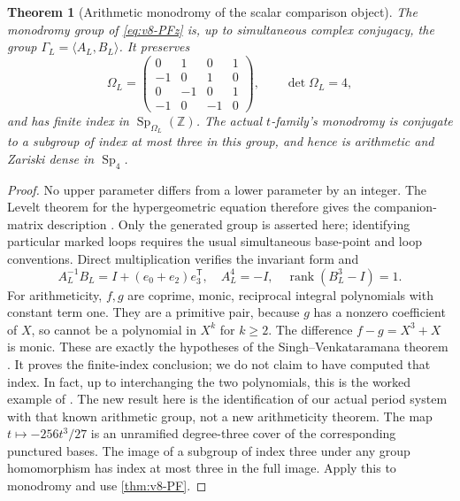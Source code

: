 \documentclass[11pt]{article}
\newtheorem{theorem}{Theorem}[section]
\theoremstyle{definition}
\theoremstyle{remark}
\newcommand{\Z}{\mathbb Z}
\newcommand{\rank}{\operatorname{rank}}
\begin{document}
\begin{theorem}[Arithmetic monodromy of the scalar comparison object]
\label{thm:v8-arithmetic-monodromy}
The monodromy group of \eqref{eq:v8-PFz} is, up to simultaneous complex
conjugacy, the group $\Gamma_L=\langle A_L,B_L\rangle$. It preserves
\begin{equation}
 \Omega_L=\begin{pmatrix}
 0&1&0&1\\-1&0&1&0\\0&-1&0&1\\-1&0&-1&0
 \end{pmatrix},\qquad \det\Omega_L=4,
 \label{eq:v8-Levelt-form}
\end{equation}
and has finite index in $\operatorname{Sp}_{\Omega_L}(\Z)$.
The actual $t$-family's monodromy is conjugate to a subgroup of index at
most three in this group, and hence is arithmetic and Zariski dense in
$\operatorname{Sp}_4$.
\end{theorem}
\begin{proof}
No upper parameter differs from a lower parameter by an integer. The
Levelt theorem for the hypergeometric equation therefore gives the
companion-matrix description \cite{BeukersHeckman,SinghVenkataramana}.
Only the generated group is asserted here; identifying particular marked
loops requires the usual simultaneous base-point and loop conventions.
Direct multiplication verifies the invariant form and
\[
 A_L^{-1}B_L=I+(e_0+e_2)e_3^{\mathsf T},\quad
 A_L^4=-I,\quad \rank(B_L^3-I)=1.
\]
For arithmeticity, $f,g$ are coprime, monic, reciprocal integral
polynomials with constant term one. They are a primitive pair, because
$g$ has a nonzero coefficient of $X$, so cannot be a polynomial in $X^k$
for $k\ge2$. The difference $f-g=X^3+X$ is monic. These are exactly the
hypotheses of the Singh--Venkataramana theorem
\cite[Theorem~1.1]{SinghVenkataramana}. It proves the finite-index
conclusion; we do not claim to have computed that index. In fact, up to
interchanging the two polynomials, this is the worked example of
\cite[Section~2.1]{SinghVenkataramana}. The new result here is the
identification of our actual period system with that known arithmetic group,
not a new arithmeticity theorem.
The map $t\mapsto-256t^3/27$ is an unramified degree-three cover of the
corresponding punctured bases. The image of a subgroup of index three
under any group homomorphism has index at most three in the full image.
Apply this to monodromy and use \cref{thm:v8-PF}.
\end{proof}
\end{document}
